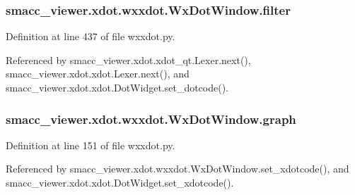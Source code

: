 \subsubsection[{\texorpdfstring{filter}{filter}}]{\setlength{\rightskip}{0pt plus 5cm}smacc\+\_\+viewer.\+xdot.\+wxxdot.\+Wx\+Dot\+Window.\+filter}\hypertarget{classsmacc__viewer_1_1xdot_1_1wxxdot_1_1WxDotWindow_a5e101de60b007a1b4b108f2d82ac0556}{}\label{classsmacc__viewer_1_1xdot_1_1wxxdot_1_1WxDotWindow_a5e101de60b007a1b4b108f2d82ac0556}


Definition at line 437 of file wxxdot.\+py.



Referenced by smacc\+\_\+viewer.\+xdot.\+xdot\+\_\+qt.\+Lexer.\+next(), smacc\+\_\+viewer.\+xdot.\+xdot.\+Lexer.\+next(), and smacc\+\_\+viewer.\+xdot.\+xdot.\+Dot\+Widget.\+set\+\_\+dotcode().

\subsubsection[{\texorpdfstring{graph}{graph}}]{\setlength{\rightskip}{0pt plus 5cm}smacc\+\_\+viewer.\+xdot.\+wxxdot.\+Wx\+Dot\+Window.\+graph}\hypertarget{classsmacc__viewer_1_1xdot_1_1wxxdot_1_1WxDotWindow_ab15a1b3b7b919b6b132b067cfba2669a}{}\label{classsmacc__viewer_1_1xdot_1_1wxxdot_1_1WxDotWindow_ab15a1b3b7b919b6b132b067cfba2669a}


Definition at line 151 of file wxxdot.\+py.



Referenced by smacc\+\_\+viewer.\+xdot.\+wxxdot.\+Wx\+Dot\+Window.\+set\+\_\+xdotcode(), and smacc\+\_\+viewer.\+xdot.\+xdot.\+Dot\+Widget.\+set\+\_\+xdotcode().

